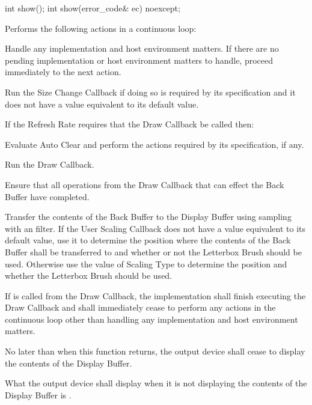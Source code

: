 \begin{itemdecl}
int show();
int show(error_code& ec) noexcept;
\end{itemdecl}
\begin{itemdescr}
\pnum
\effects
Performs the following actions in a continuous loop:
\begin{enumeraten}
	\item Handle any implementation and host environment matters. If there are no pending implementation or host environment matters to handle, proceed immediately to the next action.
	\item Run the Size Change Callback if doing so is required by its specification and it does not have a value equivalent to its default value.
	\item If the Refresh Rate requires that the Draw Callback be called then:
	\begin{enumeratea}
		\item Evaluate Auto Clear and perform the actions required by its specification, if any.
		\item Run the Draw Callback.
		\item Ensure that all operations from the Draw Callback that can effect the Back Buffer have completed.
		\item Transfer the contents of the Back Buffer to the Display Buffer using sampling with an \unspecnorm filter. If the User Scaling Callback does not have a value equivalent to its default value, use it to determine the position where the contents of the Back Buffer shall be transferred to and whether or not the Letterbox Brush should be used. Otherwise use the value of Scaling Type to determine the position and whether the Letterbox Brush should be used.
	\end{enumeratea}
\end{enumeraten}

\pnum
If  is called from the Draw Callback, the implementation shall finish executing the Draw Callback and shall immediately cease to perform any actions in the continuous loop other than handling any implementation and host environment matters.

\pnum
No later than when this function returns, the output device shall cease to display the contents of the Display Buffer.

\pnum
What the output device shall display when it is not displaying the contents of the Display Buffer is \unspecnorm.


\end{itemdescr}
